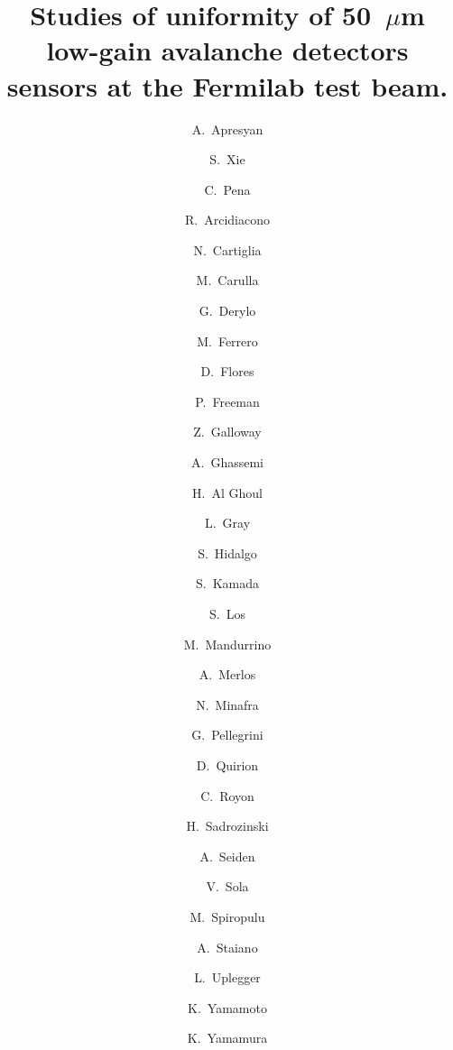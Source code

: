 \documentclass[preprint,1p]{elsarticle}
\begin{document}
\linenumbers

\begin{frontmatter}



\title{Studies of uniformity of 50~$\mu$m low-gain avalanche detectors sensors
at the Fermilab test beam.}


\author[1]{A.~Apresyan}
\author[2]{S.~Xie}
\author[2]{C.~Pena}
\author[5,7]{R.~Arcidiacono}
\author[5]{N.~Cartiglia}
\author[8]{M.~Carulla}
\author[1]{G.~Derylo}
\author[5]{M.~Ferrero}
\author[8]{D.~Flores}
\author[4]{P.~Freeman}
\author[4]{Z.~Galloway}
\author[9]{A.~Ghassemi}
\author[3]{H.~Al Ghoul}
\author[1]{L.~Gray}
\author[8]{S.~Hidalgo}
\author[9]{S.~Kamada}
\author[1]{S.~Los}
\author[5]{M.~Mandurrino}
\author[8]{A.~Merlos}
\author[3]{N.~Minafra}
\author[8]{G.~Pellegrini}
\author[8]{D.~Quirion}
\author[3]{C.~Royon}
\author[4]{H.~Sadrozinski}
\author[4]{A.~Seiden}
\author[5]{V.~Sola}
\author[2]{M.~Spiropulu}
\author[5]{A.~Staiano}
\author[1]{L.~Uplegger}
\author[9]{K.~Yamamoto}
\author[9]{K.~Yamamura}

\address[1]{Fermi National Accelerator Laboratory, Batavia, IL, USA}
\address[2]{California Institute of Technology, Pasadena, CA, USA}
\address[3]{University of Kansas, KS, USA}
\address[4]{SCIPP, University of California Santa Cruz, CA, USA}
\address[5]{INFN, Torino, Italy}
\address[6]{Universit\`a di Torino, Torino, Italy}
\address[7]{Universit\`a del Piemonte Orientale, Italy}
\address[8]{Centro Nacional de Microelectr\`onica (IMB-CNM-CSIC), Barcelona, Spain}
\address[9]{Hamamatsu Photonics (HPK), Hamamatsu, Japan}


\end{frontmatter}
\end{document}
